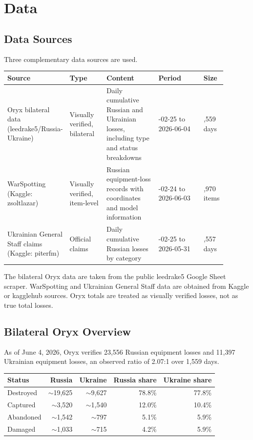 \documentclass[a4paper,11pt]{article}
\begin{document}
\section{Data}

\subsection{Data Sources}

Three complementary data sources are used.

\begingroup
\small
\setlength{\tabcolsep}{3pt}
\begin{longtable}{@{}>{\raggedright\arraybackslash}p{0.18\linewidth}>{\raggedright\arraybackslash}p{0.17\linewidth}>{\raggedright\arraybackslash}p{0.24\linewidth}>{\raggedright\arraybackslash}p{0.21\linewidth}>{\raggedright\arraybackslash}p{0.09\linewidth}@{}}
\toprule
Source & Type & Content & Period & Size \\
\midrule
\endhead
Oryx bilateral data (leedrake5/Russia-Ukraine) & Visually verified, bilateral & Daily cumulative Russian and Ukrainian losses, including type and status breakdowns & 2022-02-25 to 2026-06-04 & 1,559 days \\
WarSpotting (Kaggle: zsoltlazar) & Visually verified, item-level & Russian equipment-loss records with coordinates and model information & 2022-02-24 to 2026-06-03 & 22,970 items \\
Ukrainian General Staff claims (Kaggle: piterfm) & Official claims & Daily cumulative Russian losses by category & 2022-02-25 to 2026-05-31 & 1,557 days \\
\bottomrule
\end{longtable}
\endgroup

The bilateral Oryx data are taken from the public leedrake5 Google Sheet scraper. WarSpotting and Ukrainian General Staff data are obtained from Kaggle or kagglehub sources. Oryx totals are treated as visually verified losses, not as true total losses.

\subsection{Bilateral Oryx Overview}

As of June 4, 2026, Oryx verifies 23,556 Russian equipment losses and 11,397 Ukrainian equipment losses, an observed ratio of 2.07:1 over 1,559 days.

\begin{longtable}{lrrrr}
\toprule
Status & Russia & Ukraine & Russia share & Ukraine share \\
\midrule
\endhead
Destroyed & $\sim$19,625 & $\sim$9,627 & 78.8\% & 77.8\% \\
Captured & $\sim$3,520 & $\sim$1,540 & 12.0\% & 10.4\% \\
Abandoned & $\sim$1,542 & $\sim$797 & 5.1\% & 5.9\% \\
Damaged & $\sim$1,033 & $\sim$715 & 4.2\% & 5.9\% \\
\bottomrule
\end{longtable}
\end{document}
